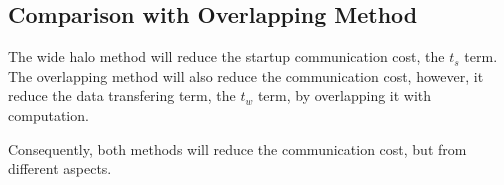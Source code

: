 \subsection{Comparison with Overlapping Method}
The wide halo method will reduce the startup communication cost, the $t_s$ term.  
The overlapping method will also reduce the communication cost, however, it reduce the 
data transfering term, the $t_w$ term, by overlapping it with computation.

Consequently, both methods will reduce the communication cost, but from different aspects.
